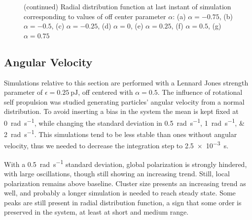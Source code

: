 \documentclass[../../master_thesis_np.tex]{subfiles}
\begin{document}
		\begin{figure}\ContinuedFloat
			\centering
			
			\caption{(continued) Radial distribution function at last instant of simulation corresponding to values of off center parameter $\alpha$: (a) $\alpha = -0.75$, (b) $\alpha = -0.5$, (c) $\alpha = -0.25$, (d) $\alpha = 0$, (e) $\alpha = 0.25$, (f) $\alpha = 0.5$, (g) $\alpha = 0.75$}
			\label{fig:lj_oc_rdf}
		\end{figure}
		
		\subsection{Angular Velocity}
		Simulations relative to this section are performed with a Lennard Jones strength parameter of $\epsilon = \SI{0.25}{\pico\joule}$, off centered with $\alpha = 0.5$.
		The influence of rotational self propulsion was studied generating particles' angular velocity from a normal distribution.
		To avoid inserting a bias in the system the mean is kept fixed at \SI{0}{\radian\per\second}, while changing the standard deviation in \qtylist{0.5; 1;2}{\radian\per\second}.
		This simulations tend to be less stable than ones without angular velocity, thus we needed to decrease the integration step to \SI{2.5 e-3}{\second}.
		
		With a \SI{0.5}{\radian\per\second} standard deviation, global polarization is strongly hindered, with large oscillations, though still showing an increasing trend.
		Still, local polarization remains above baseline.
		Cluster size presents an increasing trend as well, and probably a longer simulation is needed to reach steady state.
		Some peaks are still present in radial distribution function, a sign that some order is preserved in the system, at least at short and medium range.
		
\end{document}
